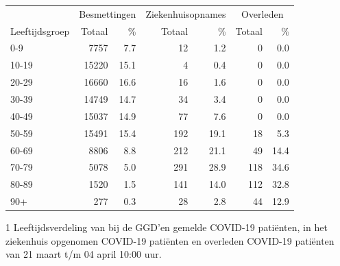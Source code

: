 \documentclass[
  english,
  man,floatsintext]{apa6}
\begin{document}
\begin{table}
\centering\begingroup\fontsize{11}{13}\selectfont

\begin{threeparttable}
\begin{tabular}{lrrrrrr}
\toprule
\multicolumn{1}{c}{ } & \multicolumn{2}{c}{Besmettingen} & \multicolumn{2}{c}{Ziekenhuisopnames} & \multicolumn{2}{c}{Overleden} \\
\cmidrule(l{3pt}r{3pt}){2-3} \cmidrule(l{3pt}r{3pt}){4-5} \cmidrule(l{3pt}r{3pt}){6-7}
Leeftijdsgroep & Totaal & \% & Totaal & \% & Totaal & \%\\
\midrule
0-9 & 7757 & 7.7 & 12 & 1.2 & 0 & 0.0\\
10-19 & 15220 & 15.1 & 4 & 0.4 & 0 & 0.0\\
20-29 & 16660 & 16.6 & 16 & 1.6 & 0 & 0.0\\
30-39 & 14749 & 14.7 & 34 & 3.4 & 0 & 0.0\\
40-49 & 15037 & 14.9 & 77 & 7.6 & 0 & 0.0\\
50-59 & 15491 & 15.4 & 192 & 19.1 & 18 & 5.3\\
60-69 & 8806 & 8.8 & 212 & 21.1 & 49 & 14.4\\
70-79 & 5078 & 5.0 & 291 & 28.9 & 118 & 34.6\\
80-89 & 1520 & 1.5 & 141 & 14.0 & 112 & 32.8\\
90+ & 277 & 0.3 & 28 & 2.8 & 44 & 12.9\\
\bottomrule
\end{tabular}
\begin{tablenotes}
\item[1] Leeftijdsverdeling van bij de GGD’en gemelde COVID-19 patiënten, in het ziekenhuis opgenomen COVID-19 patiënten en overleden COVID-19 patiënten van 21 maart t/m 04 april 10:00 uur.
\end{tablenotes}
\end{threeparttable}
\endgroup{}
\end{table}

\newpage
\end{document}
